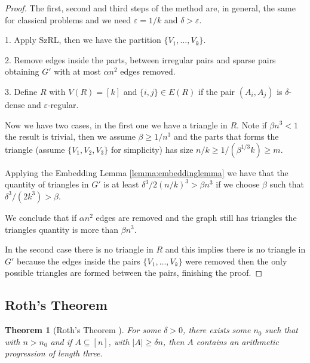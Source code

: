 \documentclass[12pt,twoside,a4paper,bibliography=totocnumbered]{book}
\numberwithin{equation}{section}
\newtheorem{theorem}             {Theorem}[section]
\theoremstyle{remark}
\begin{document}
\begin{proof}
The first, second and third steps of the method are, in general, the same for classical problems and we need $\varepsilon = 1/k$ and $\delta > \varepsilon$.

1. Apply SzRL, then we have the partition $\{V_1, \ldots , V_k\}$.

2. Remove edges inside the parts, between irregular pairs and sparse pairs obtaining $G'$ with at most $\alpha n^2$ edges removed.

3. Define $R$ with $V(R) = [k]$ and $\{i,j\} \in E(R) $ if  the pair $(A_i, A_j)$ is $\delta$-dense and $\varepsilon$-regular.

Now we have two cases, in the first one we have a triangle in $R$. Note if $\beta n^3 < 1$ the result is trivial, then we assume $\beta \geq 1/n^3$ and the parts that forms the triangle (assume $\{V_1, V_2, V_3\}$ for simplicity) has size $n/k \geq 1/(\beta ^{1/3} k) \geq m$.

Applying the Embedding Lemma \ref{lemma:embeddinglemma} we have that the quantity of triangles in $G'$ is at least $\delta ^3 /2 (n/k)^3 > \beta n^3$ if we choose $\beta$ such that $\delta ^3 / (2k^3) > \beta$.

We conclude that if $\alpha n^2$ edges are removed and the graph still has triangles the triangles quantity is more than $\beta n^3$.

In the second case there is no triangle in $R$ and this implies there is no triangle in $G'$ because the edges inside the pairs $\{V_1, \ldots , V_k\}$ were removed then the only possible triangles are formed between the pairs, finishing the proof.
\end{proof}


\subsection{Roth's Theorem}

\begin{theorem}[{Roth's Theorem \cite{Ro53}}] For some $\delta >0$, there exists some $n_0$ such that with $n > n_0$ and if $A \subseteq [n]$, with $|A| \geq \delta n$, then $A$ contains an arithmetic progression of length three. 
\end{theorem}
\end{document}
